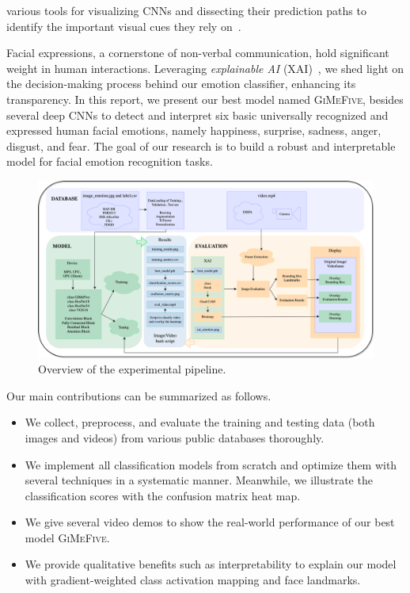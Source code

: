 various tools for visualizing CNNs and dissecting their prediction paths to identify the important visual cues they rely on~\cite{olah2018building}. 

Facial expressions, a cornerstone of non-verbal communication, 
hold significant weight in human interactions. 
Leveraging \textit{explainable AI} (XAI)~\cite{olah2018building,YinTLS019,Malik0R21}, 
we shed light on the decision-making process behind our emotion classifier, 
enhancing its transparency. 
In this report, we present our best model named \textsc{GiMeFive}, 
besides several deep CNNs to detect and interpret six basic universally recognized and expressed human facial emotions, 
namely happiness, surprise, sadness, anger, disgust, and fear. 
The goal of our research is to build a robust and interpretable model for facial emotion recognition tasks. 

\begin{figure}[ht]
  \centering
   \includegraphics[width=\linewidth]{pipeline.png}
   \caption{Overview of the experimental pipeline.} 
   \label{fig:pipeline}
\end{figure}

Our main contributions can be summarized as follows. 
\begin{itemize}
  \item We collect, preprocess, and evaluate the training and testing data 
  (both images and videos) from various public databases thoroughly. 
  \item We implement all classification models from scratch and optimize them with several techniques in a systematic manner. 
  Meanwhile, we illustrate the classification scores with the confusion matrix heat map. 
  \item We give several video demos to show the real-world performance of our best model \textsc{GiMeFive}. 
  \item We provide qualitative benefits such as interpretability to explain our model with gradient-weighted class activation mapping and face landmarks.
\end{itemize}

